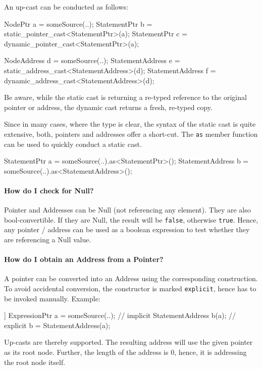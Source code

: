 An up-cast can be conducted as follows:
\begin{insCode}
	NodePtr a = someSource(..);
	StatementPtr b = static_pointer_cast<StatementPtr>(a);
	StatementPtr c = dynamic_pointer_cast<StatementPtr>(a);

	NodeAddress d = someSource(..);
	StatementAddress e = static_address_cast<StatementAddress>(d);
	StatementAddress f = dynamic_address_cast<StatementAddress>(d);
\end{insCode}

Be aware, while the static cast is returning a re-typed reference to the
original pointer or address, the dynamic cast returns a fresh, re-typed copy.

Since in many cases, where the type is clear, the syntax of the static cast is
quite extensive, both, pointers and addresses offer a short-cut. The \texttt{as}
member function can be used to quickly conduct a static cast.

\begin{insCode}
	StatementPtr a = someSource(..).as<StatementPtr>();
	StatementAddress b = someSource(..).as<StatementAddress>();
\end{insCode}

\paragraph{How do I check for Null?}
Pointer and Addresses can be Null (not referencing any element). They are also
bool-convertible. If they are Null, the result will be \lstinline|false|,
otherwise \lstinline|true|. Hence, any pointer / address can be used as a
boolean expression to test whether they are referencing a Null value.

\paragraph{How do I obtain an Address from a Pointer?}
A pointer can be converted into an Address using the corresponding construction.
To avoid accidental conversion, the constructor is marked \lstinline|explicit|,
hence has to be invoked manually. Example:
\begin{insCode}]
	ExpressionPtr a = someSource(..);
	// implicit
	StatementAddress b(a);
	// explicit
	b = StatementAddress(a);
\end{insCode}
Up-casts are thereby supported. The resulting address will use the given pointer
as its root node. Further, the length of the address is 0, hence, it is
addressing the root node itself.

